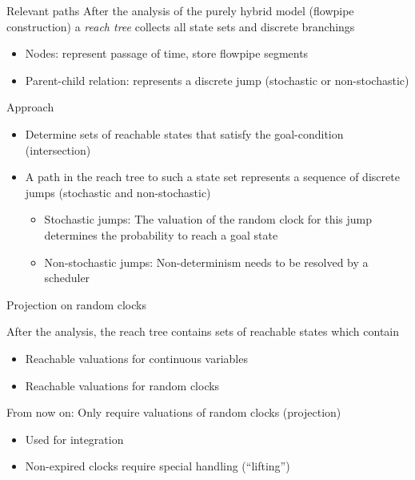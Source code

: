 \documentclass[aspectratio=169]{beamer}
\newcommand{\cb}[1]{\textcolor{blue100}{#1}\xspace}
\begin{document}
\begin{frame}{Relevant paths}
After the analysis of the purely hybrid model (flowpipe construction) a \emph{reach tree} collects all state sets and discrete branchings
\begin{itemize}
  \item Nodes: represent passage of time, store flowpipe segments
  \item Parent-child relation: represents a discrete jump (stochastic or non-stochastic)
\end{itemize}

\bigskip

\cb{Approach}
\begin{itemize}
  \item Determine sets of reachable states that satisfy the goal-condition (intersection)
  \item A path in the reach tree to such a state set represents a sequence of discrete jumps (stochastic and non-stochastic)
  \begin{itemize}
    \item Stochastic jumps: The valuation of the random clock for this jump determines the probability to reach a goal state
    \item Non-stochastic jumps: Non-determinism needs to be resolved by a scheduler
  \end{itemize}
\end{itemize}





\end{frame}


\begin{frame}{Projection on random clocks}

  After the analysis, the reach tree contains sets of reachable states which contain
  \begin{itemize}
    \item Reachable valuations for continuous variables
    \item Reachable valuations for random clocks
  \end{itemize}

  \medskip

  From now on: Only require valuations of random clocks (projection)
  \begin{itemize}
    \item Used for integration
    \item Non-expired clocks require special handling (\enquote{lifting})
  \end{itemize}

  \bigskip

  \centering
  

\end{frame}
\end{document}
